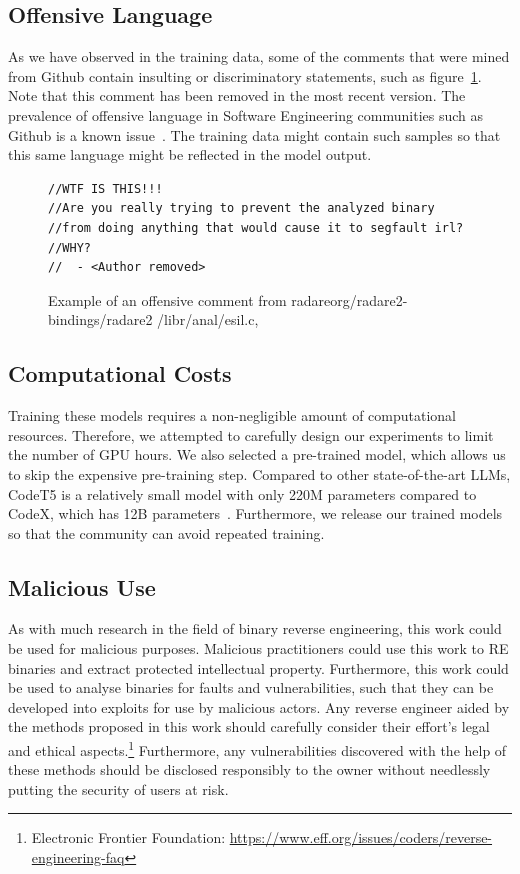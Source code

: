 \subsection{Offensive Language}
As we have observed in the training data, some of the comments that were mined from Github contain insulting or discriminatory statements, such as figure~\ref{fig:offensive}. Note that this comment has been removed in the most recent version. The prevalence of offensive language in Software Engineering communities such as Github is a known issue~\cite{OffensiveLanguage}. The training data might contain such samples so that this same language might be reflected in the model output. 

\begin{figure}[tbh]
  \centering
\begin{verbatim}
//WTF IS THIS!!!
//Are you really trying to prevent the analyzed binary 
//from doing anything that would cause it to segfault irl?
//WHY?
//	- <Author removed>
\end{verbatim}
  \caption{Example of an offensive comment from radareorg/radare2-bindings/radare2 /libr/anal/esil.c,}
  \label{fig:offensive}
\end{figure}


\subsection{Computational Costs}
Training these models requires a non-negligible amount of computational resources. Therefore, we attempted to carefully design our experiments to limit the number of GPU hours. We also selected a pre-trained model, which allows us to skip the expensive pre-training step. Compared to other state-of-the-art LLMs, CodeT5 is a relatively small model with only 220M parameters compared to CodeX, which has 12B parameters~\cite{CodeX}. Furthermore, we release our trained models so that the community can avoid repeated training.

\subsection{Malicious Use}
As with much research in the field of binary reverse engineering, this work could be used for malicious purposes. Malicious practitioners could use this work to RE binaries and extract protected intellectual property. Furthermore, this work could be used to analyse binaries for faults and vulnerabilities, such that they can be developed into exploits for use by malicious actors. Any reverse engineer aided by the methods proposed in this work should carefully consider their effort's legal and ethical aspects.\footnote{Electronic Frontier Foundation: \url{https://www.eff.org/issues/coders/reverse-engineering-faq}} Furthermore, any vulnerabilities discovered with the help of these methods should be disclosed responsibly to the owner without needlessly putting the security of users at risk. 